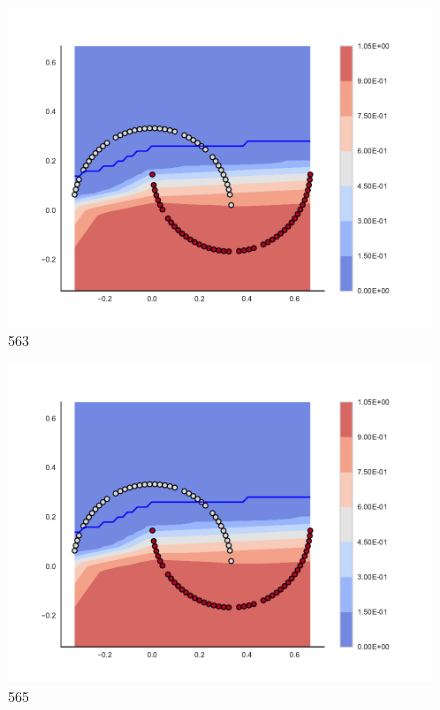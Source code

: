 \begin{subfigure}[b]{0.09\textwidth}
    \includegraphics[clip, trim=2.35cm 1.75cm 4.5cm 0cm,width=\textwidth]{img/convergence/563.pdf}
    \caption{563}
    \label{fig:convergence_563}
\end{subfigure}
%
\begin{subfigure}[b]{0.09\textwidth}
    \includegraphics[clip, trim=2.35cm 1.75cm 4.5cm 0cm,width=\textwidth]{img/convergence/565.pdf}
    \caption{565}
    \label{fig:convergence_565}
\end{subfigure}
%
